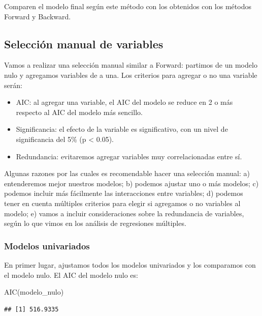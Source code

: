 \documentclass[
]{book}
\newenvironment{Shaded}{\begin{snugshade}}{\end{snugshade}}
\newcommand{\FunctionTok}[1]{\textcolor[rgb]{0.00,0.00,0.00}{#1}}
\newcommand{\NormalTok}[1]{#1}
\providecommand{\tightlist}{%
  \setlength{\itemsep}{0pt}\setlength{\parskip}{0pt}}
\begin{document}
Comparen el modelo final según este método con los obtenidos con los métodos Forward y Backward.

\hypertarget{selecciuxf3n-manual-de-variables}{%
\subsection{Selección manual de variables}\label{selecciuxf3n-manual-de-variables}}

Vamos a realizar una selección manual similar a Forward: partimos de un modelo nulo y agregamos variables de a una. Los criterios para agregar o no una variable serán:

\begin{itemize}
\tightlist
\item
  AIC: al agregar una variable, el AIC del modelo se reduce en 2 o más respecto al AIC del modelo más sencillo.
\item
  Significancia: el efecto de la variable es significativo, con un nivel de significancia del 5\% (p \textless{} 0.05).
\item
  Redundancia: evitaremos agregar variables muy correlacionadas entre sí.
\end{itemize}

Algunas razones por las cuales es recomendable hacer una selección manual: a) entenderemos mejor nuestros modelos; b) podemos ajustar uno o más modelos; c) podemos incluir más fácilmente las interacciones entre variables; d) podemos tener en cuenta múltiples criterios para elegir si agregamos o no variables al modelo; e) vamos a incluir consideraciones sobre la redundancia de variables, según lo que vimos en los análisis de regresiones múltiples.

\hypertarget{modelos-univariados}{%
\subsubsection{Modelos univariados}\label{modelos-univariados}}

En primer lugar, ajustamos todos los modelos univariados y los comparamos con el modelo nulo. El AIC del modelo nulo es:

\begin{Shaded}
\begin{Highlighting}[]
\FunctionTok{AIC}\NormalTok{(modelo\_nulo)}
\end{Highlighting}
\end{Shaded}

\begin{verbatim}
## [1] 516.9335
\end{verbatim}
\end{document}
